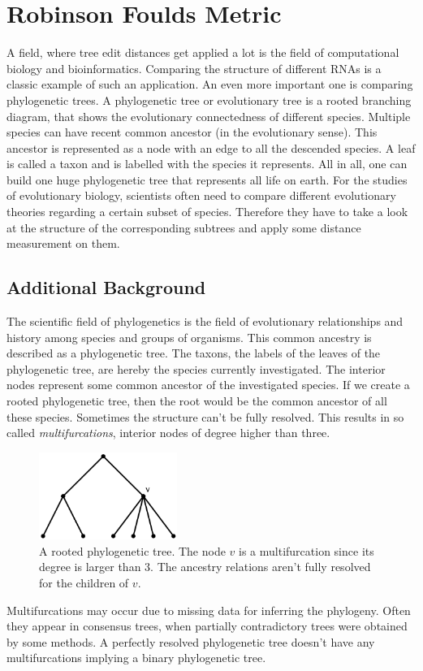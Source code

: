 \chapter{Robinson Foulds Metric}
A field, where tree edit distances get applied a lot is the field of computational biology and bioinformatics. Comparing the structure of different RNAs is a classic example of such an application. An even more important one is comparing phylogenetic trees. A phylogenetic tree or evolutionary tree is a rooted branching diagram, that shows the evolutionary connectedness of different species. Multiple species can have recent common ancestor (in the evolutionary sense). This ancestor is represented as a node with an edge to all the descended species. A leaf is called a taxon and is labelled with the species it represents. All in all, one can build one huge phylogenetic tree that represents all life on earth. For the studies of evolutionary biology, scientists often need to compare different evolutionary theories regarding a certain subset of species. Therefore they have to take a look at the structure of the corresponding subtrees and apply some distance measurement on them. \\


\section{Additional Background}
The scientific field of phylogenetics is the field of evolutionary relationships and history among species and groups of organisms. This common ancestry is described as a phylogenetic tree. The taxons, the labels of the leaves of the phylogenetic tree, are hereby the species currently investigated. The interior nodes represent some common ancestor of the investigated species. If we create a rooted phylogenetic tree, then the root would be the common ancestor of all these species. Sometimes the structure can't be fully resolved. This results in so called \textit{multifurcations}, interior nodes of degree higher than three. 
\begin{figure}
	\centering
	\includegraphics[width=0.4\textwidth]{figures/multifurcation.png}
    \caption{A rooted phylogenetic tree. The node $v$ is a multifurcation since its degree is larger than $3$. The ancestry relations aren't fully resolved for the children of $v$.}
\end{figure}
Multifurcations may occur due to missing data for inferring the phylogeny. Often they appear in consensus trees, when partially contradictory trees were obtained by some methods. A perfectly resolved phylogenetic tree doesn't have any multifurcations implying a binary phylogenetic tree. 

